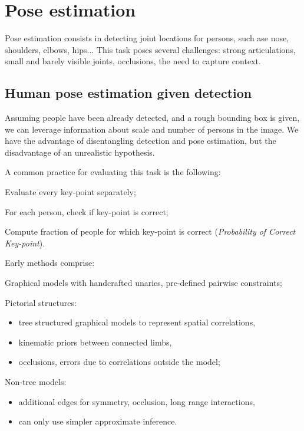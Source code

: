 \section{Pose estimation}\label{sec:pose-estimation}

Pose estimation consists in detecting joint locations for persons, such ase nose, shoulders, elbows, hips... This task poses several challenges: strong articulations, small and barely visible joints, occlusions, the need to capture context.


\subsection{Human pose estimation given detection}\label{sec:pe-given-detection}

Assuming people have been already detected, and a rough bounding box is given, we can leverage information about scale and number of persons in the image. We have the advantage of disentangling detection and pose estimation, but the disadvantage of an unrealistic hypothesis.

A common practice for evaluating this task is the following:
\begin{myitem}
    \item Evaluate every key-point separately;
    \item For each person, check if key-point is correct;
    \item Compute fraction of people for which key-point is correct (\textit{Probability of Correct Key-point}).
\end{myitem}

Early methods comprise:
\begin{myitem}
    \item Graphical models with handcrafted unaries, pre-defined pairwise constraints;
    \item Pictorial structures:
    \begin{itemize}
        \item tree structured graphical models to represent spatial correlations,
        \item kinematic priors between connected limbs,
        \item occlusions, errors due to correlations outside the model;
    \end{itemize}
    \item Non-tree models:
    \begin{itemize}
        \item additional edges for symmetry, occlusion, long range interactions,
        \item can only use simpler approximate inference.
    \end{itemize}
\end{myitem}

